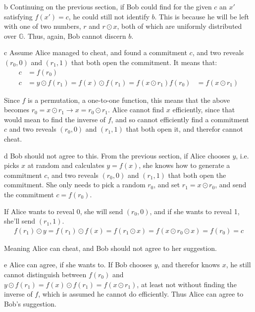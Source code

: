 \documentclass{article}
\begin{document}
\begin{paragraph}
    b Continuing on the previous section, if Bob could find for the given \(c\) an \(x'\) satisfying \(f(x') = c\), he could still not identify \(b\). This is because he will be left with one of two numbers, \(r\) and \(r \odot x\), both of which are uniformly distributed over \(\mathbb{G}\). Thus, again, Bob cannot discern \(b\).
\end{paragraph}

\begin{paragraph}
    c Assume Alice managed to cheat, and found a commitment \(c\), and two reveals \((r_0, 0)\) and \((r_1, 1)\) that both open the commitment. It means that:
    \begin{align*}
        c &= f(r_0)\\
        c &= y \odot f(r_1) = f(x) \odot f(r_1) = f(x \odot r_1)
        f(r_0) &= f(x \odot r_1)
    \end{align*}
    
    Since \(f\) is a permutation, a one-to-one function, this means that the above becomes \(r_0 = x \odot r_1 \rightarrow x = r_0 \odot r_1\). Alice cannot find \(x\) efficiently, since that would mean to find the inverse of \(f\), and so cannot efficiently find a commitment \(c\) and two reveals \((r_0, 0)\) and \((r_1, 1)\) that both open it, and therefor cannot cheat.
\end{paragraph}

\begin{paragraph}
    d Bob should not agree to this. From the previous section, if Alice chooses \(y\), i.e. picks \(x\) at random and calculates \(y = f(x)\), she knows how to generate a commitment \(c\), and two reveals \((r_0, 0)\) and \((r_1, 1)\) that both open the commitment. She only needs to pick a random \(r_0\), and set \(r_1 = x \odot r_0\), and send the commitment \(c = f(r_0)\).
    
    If Alice wants to reveal 0, she will send \((r_0, 0)\), and if she wants to reveal 1, she'll send \((r_1, 1)\).
    \begin{align*}
        f(r_1) \odot y = f(r_1) \odot f(x) = f(r_1 \odot x) = f(x \odot r_0 \odot x) = f(r_0) = c
    \end{align*}
    
    Meaning Alice can cheat, and Bob should not agree to her suggestion.
\end{paragraph}

\begin{paragraph}
    e Alice can agree, if she wants to. If Bob chooses \(y\), and therefor knows \(x\), he still cannot distinguish between \(f(r_0)\) and \(y \odot f(r_1) = f(x) \odot f(r_1) = f(x \odot r_1)\), at least not without finding the inverse of \(f\), which is assumed he cannot do efficiently. Thus Alice can agree to Bob's suggestion.
\end{paragraph}
\end{document}
